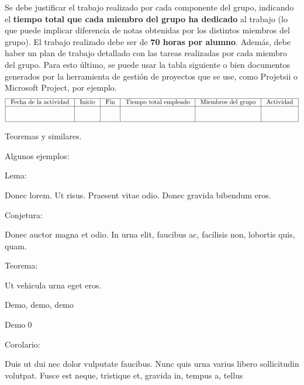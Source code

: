 \documentclass{pid}
\begin{document}
Se debe justificar el trabajo realizado por cada componente del grupo, indicando el {\bf tiempo total que cada miembro del grupo ha dedicado} al trabajo (lo que puede implicar diferencia de notas obtenidas por los distintos miembros del grupo). El trabajo realizado debe ser de {\bf 70 horas por alumno}. Además, debe haber un plan de trabajo detallado con las tareas realizadas por cada miembro del grupo. Para esto último, se puede usar la tabla siguiente o bien documentos generados por la herramienta de gestión de proyectos que se use, como Projetsii o Microsoft Project, por ejemplo.
$$\begin{array}{|c|c|c|c|c|c|}
\hline
\mbox{ Fecha de la
 actividad }
& \mbox{ Inicio }
& \mbox{ Fin }
&\mbox{ Tiempo
total
empleado }
&	\mbox{
Miembros
del grupo
}
&	\mbox{ Actividad }\\\hline
\mbox{ }&\mbox{}&\mbox{ }&\mbox{}&\mbox{ }&\mbox{}\\
\mbox{ }&\mbox{}&\mbox{ }&\mbox{}&\mbox{ }&\mbox{}\\\hline\end{array}$$

\newpage
{}

\noindent Teoremas y similares.

Algunos ejemplos:

 Lema:

\begin{lem}
Donec lorem. Ut risus. Praesent vitae odio. Donec gravida bibendum eros.
\end{lem}

Conjetura:

\begin{conj}
Donec auctor magna et odio. In urna elit, faucibus ac, facilisis non, lobortis quis, quam.
\end{conj}

Teorema:

\begin{thm}
Ut vehicula urna eget eros.
\end{thm}

\begin{pf}
Demo, demo, demo

Demo\qed
\end{pf}

Corolario:

\begin{cor}
Duis ut dui nec dolor vulputate faucibus. Nunc quis urna varius libero sollicitudin volutpat. Fusce est neque, tristique et, gravida in, tempus a, tellus
\end{cor}
\end{document}
